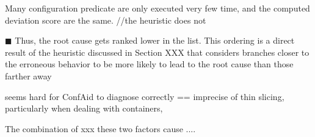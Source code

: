 Many configuration predicate are only executed very few time, and the computed deviation score are the same.
//the heuristic does not


$\blacksquare$
Thus, the root cause gets
ranked lower in the list. This ordering is a direct result
of the heuristic discussed in Section XXX that considers
branches closer to the erroneous behavior to be more
likely to lead to the root cause than those farther away

seems hard for ConfAid to diagnose correctly
== imprecise of thin slicing, particularly when dealing with containers,

The combination of xxx these two factors cause ....


